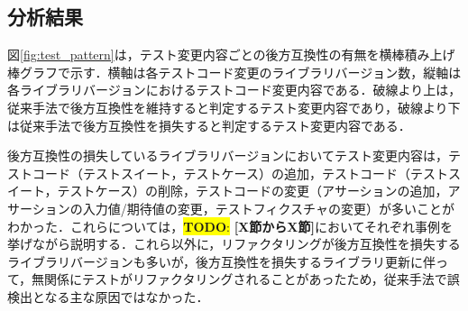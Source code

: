 \documentclass[submit]{ipsj}
\newcommand{\todo}[1]{\colorbox{yellow}{{\bf TODO}:}{\color{red} {\textbf{[#1]}}}}
\begin{document}
\subsection{分析結果}

図\ref{fig:test_pattern}は，テスト変更内容ごとの後方互換性の有無を横棒積み上げ棒グラフで示す．横軸は各テストコード変更のライブラリバージョン数，縦軸は各ライブラリバージョンにおけるテストコード変更内容である．破線より上は，従来手法で後方互換性を維持すると判定するテスト変更内容であり，破線より下は従来手法で後方互換性を損失すると判定するテスト変更内容である．

後方互換性の損失しているライブラリバージョンにおいてテスト変更内容は，テストコード（テストスイート，テストケース）の追加，テストコード（テストスイート，テストケース）の削除，テストコードの変更（アサーションの追加，アサーションの入力値/期待値の変更，テストフィクスチャの変更）が多いことがわかった．これらについては，\todo{X節からX節}においてそれぞれ事例を挙げながら説明する．これら以外に，リファクタリングが後方互換性を損失するライブラリバージョンも多いが，後方互換性を損失するライブラリ更新に伴って，無関係にテストがリファクタリングされることがあったため，従来手法で誤検出となる主な原因ではなかった．

\end{document}
